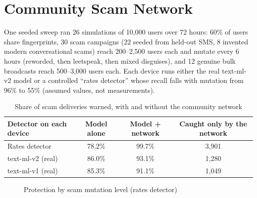 \section{Community Scam Network}\label{sec:netres}
\noindent One seeded sweep ran 26 simulations of 10,000 users over 72 hours: 60\% of users share fingerprints, 30 scam campaigns (22 seeded from held-out SMS, 8 invented modern conversational scams) reach 200--2,500 users each and mutate every 6 hours (reworded, then leetspeak, then mixed disguises), and 12 genuine bulk broadcasts reach 500--3,000 users each. Each device runs either the real text-ml-v2 model or a controlled ``rates detector'' whose recall falls with mutation from 96\% to 55\% (assumed values, not measurements).

\begin{table}[H]
\centering
\small
\renewcommand{\arraystretch}{1.15}
\caption{Share of scam deliveries warned, with and without the community network}
\label{tab:net1}
\begin{tabular}{|l|c|c|c|}
\hline
\textbf{Detector on each device} & \textbf{Model alone} & \textbf{Model + network} & \textbf{Caught only by the network} \\ \hline
Rates detector & 78.2\% & 99.7\% & 3,901 \\ \hline
text-ml-v2 (real) & 86.0\% & 93.1\% & 1,280 \\ \hline
text-ml-v1 (real) & 85.3\% & 91.1\% & 1,049 \\ \hline
\end{tabular}
\end{table}

\begin{figure}[H]
\centering
{}
\caption{Protection by scam mutation level (rates detector)}
\label{fig:netmut}
\end{figure}

